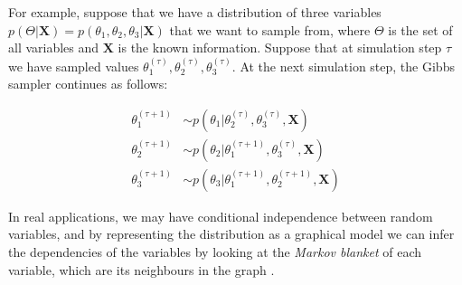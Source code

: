For example, suppose that we have a distribution of three variables $p(\Theta|\mathbf{X}) = p(\theta_{1}, \theta_{2}, \theta_{3}|\mathbf{X})$ that we want to sample from, where $\Theta$ is the set of all variables and $\mathbf{X}$ is the known information. Suppose that at simulation step $\tau$ we have sampled values $\theta_{1}^{(\tau)}, \theta_{2}^{(\tau)}, \theta_{3}^{(\tau)}$. At the next simulation step, the Gibbs sampler continues as follows:

\begin{equation} \label{gibbs-f-bayes}
  \begin{aligned}
	\theta_{1}^{(\tau+1)} & \sim p(\theta_{1} | \theta_{2}^{(\tau)}, \theta_{3}^{(\tau)}, \mathbf{X}) \\
	\theta_{2}^{(\tau+1)} & \sim p(\theta_{2} | \theta_{1}^{(\tau+1)}, \theta_{3}^{(\tau)}, \mathbf{X}) \\
	\theta_{3}^{(\tau+1)} & \sim p(\theta_{3} | \theta_{1}^{(\tau+1)}, \theta_{2}^{(\tau+1)}, \mathbf{X}) 
  \end{aligned}
\end{equation}

In real applications, we may have conditional independence between random variables, and by representing the distribution as a graphical model we can infer the dependencies of the variables by looking at the \emph{Markov blanket} of each variable, which are its neighbours in the graph \cite[Ch. 8]{Bishop2006}. 
